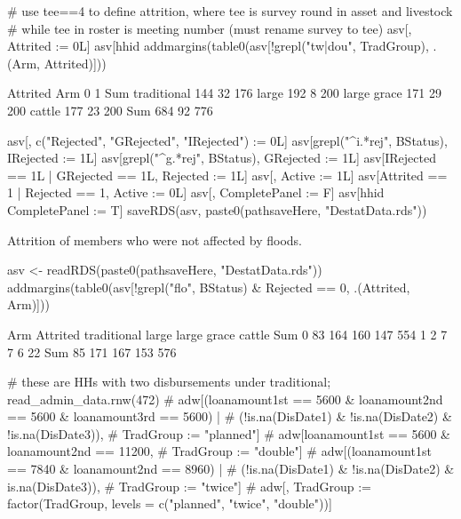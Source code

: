 \begin{Schunk}
\begin{Sinput}
# use tee==4 to define attrition, where tee is survey round in asset and livestock 
# while tee in roster is meeting number (must rename survey to tee)
asv[, Attrited := 0L]
asv[hhid %
addmargins(table0(asv[!grepl("tw|dou", TradGroup), .(Arm, Attrited)]))
\end{Sinput}
\begin{Soutput}
             Attrited
Arm             0   1 Sum
  traditional 144  32 176
  large       192   8 200
  large grace 171  29 200
  cattle      177  23 200
  Sum         684  92 776
\end{Soutput}
\begin{Sinput}
asv[, c("Rejected", "GRejected", "IRejected") := 0L]
asv[grepl("^i.*rej", BStatus), IRejected := 1L]
asv[grepl("^g.*rej", BStatus), GRejected := 1L]
asv[IRejected == 1L | GRejected == 1L, Rejected := 1L]
asv[, Active := 1L]
asv[Attrited == 1 | Rejected == 1, Active := 0L]
asv[, CompletePanel := F]
asv[hhid %
  CompletePanel := T]
saveRDS(asv, paste0(pathsaveHere, "DestatData.rds"))
\end{Sinput}
\end{Schunk}
Attrition of members who were not affected by floods.
\begin{Schunk}
\begin{Sinput}
asv <- readRDS(paste0(pathsaveHere, "DestatData.rds"))
addmargins(table0(asv[!grepl("flo", BStatus) & Rejected == 0, .(Attrited, Arm)]))
\end{Sinput}
\begin{Soutput}
        Arm
Attrited traditional large large grace cattle Sum
     0            83   164         160    147 554
     1             2     7           7      6  22
     Sum          85   171         167    153 576
\end{Soutput}
\begin{Sinput}
# these are HHs with two disbursements under traditional; read_admin_data.rnw(472)
# adw[(loanamount1st == 5600 & loanamount2nd == 5600 & loanamount3rd == 5600) |
#   (!is.na(DisDate1) & !is.na(DisDate2) & !is.na(DisDate3)), 
#   TradGroup := "planned"]
# adw[loanamount1st == 5600 & loanamount2nd == 11200, 
#   TradGroup := "double"]
# adw[(loanamount1st == 7840 & loanamount2nd == 8960) | 
#   (!is.na(DisDate1) & !is.na(DisDate2) & is.na(DisDate3)), 
#   TradGroup := "twice"]
# adw[, TradGroup := factor(TradGroup, levels = c("planned", "twice", "double"))]
\end{Sinput}
\end{Schunk}
